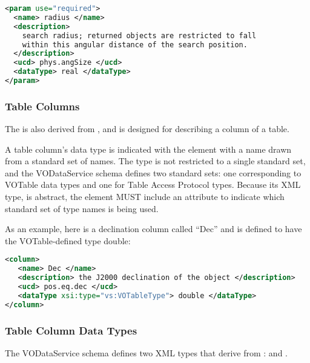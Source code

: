 \documentclass[11pt,a4paper]{ivoa}
\begin{document}
\begin{lstlisting}[language=XML]
<param use="required">
  <name> radius </name>
  <description>
    search radius; returned objects are restricted to fall 
    within this angular distance of the search position.
  </description>
  <ucd> phys.angSize </ucd>
  <dataType> real </dataType>
</param>
\end{lstlisting}

\subsubsection{Table Columns}
\label{sect:columns}


The  is also derived from
, and is designed for describing a column of
a table.




A table column's data type is indicated with the 
element with a name drawn from a standard set of names.  The
 type is not restricted to a single standard
set, and the VODataService schema defines two standard sets: one
corresponding to VOTable data types \citep{VOTable}
and one for Table Access Protocol types.  Because
its XML type,  is abstract, the
 element MUST include an
 attribute to indicate which standard set of type
names is being used.  


As an example, here is a declination column called ``Dec'' and is
defined to have the VOTable-defined type double:

\begin{lstlisting}[language=XML]
<column>
   <name> Dec </name>
   <description> the J2000 declination of the object </description>
   <ucd> pos.eq.dec </ucd>
   <dataType xsi:type="vs:VOTableType"> double </dataType>
</column>
\end{lstlisting}


\subsubsection{Table Column Data Types}
\label{tbldatatypes}


The VODataService schema defines two XML types that derive from
:   and
.  


\end{document}

